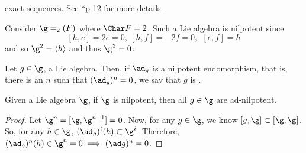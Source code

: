 \documentclass[11pt,leqno,oneside]{amsart}
\numberwithin{thm}{section}
\begin{document}
exact sequences. See \cite{humph}*{p 12} for more details.
\begin{example}
  Consider \(\g = \sl_2(F)\) where \(\Char F = 2\). Such a Lie algebra
  is nilpotent since \[
    [h,e] = 2e = 0, \ [h,f] = -2f = 0, \ \ [e,f] = h
  \]
  and so \(\g^2 = \langle h \rangle\) and thus \(\g^3 = 0\).
\end{example}
\begin{defn}
  Let \(g \in \g\), a Lie algebra. Then, if \(\ad_g\) is a nilpotent
  endomorphism, that is, there is an \(n\) such that \((\ad_g)^n =
  0\), we say that \(g\) is . 
\end{defn}
\begin{prop}
  Given a Lie algebra \(\g\), if \(\g\) is nilpotent,
  then all \(g \in \g\) are ad-nilpotent.
\end{prop}
\begin{proof}
  Let \(\g^n = [\g, \g^{n-1}] = 0\). Now, for any \(g \in \g\), we
  know \([g,\g] \subset [\g,\g]\). So, for any \(h \in \g\),
  \((\ad_g)^i(h) \subset \g^i\). Therefore, \((\ad_g)^n(h) \in \g^n = 0
  \implies (\ad g)^n = 0\). 
\end{proof}
\end{document}
